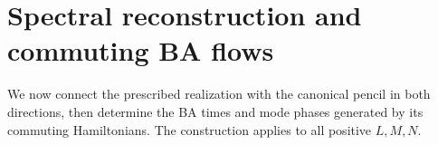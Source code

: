\section{Spectral reconstruction and commuting BA flows}
\label{sec:BA-reconstruction-flows}

We now connect the prescribed realization with the canonical pencil
in both directions, then determine the BA times and mode phases
generated by its commuting Hamiltonians. The construction applies
to all positive $L,M,N$.



